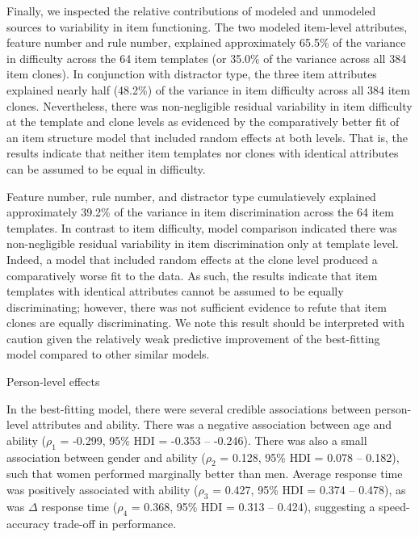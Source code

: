 \documentclass[a4paper,man,natbib]{apa6}
\makeatletter
\renewcommand{\subsubsection}{\@startsection{subsubsection}{3}
  {\z@}%
  {\b@level@two@skip}{\e@level@two@skip}%
  {\normalfont\normalsize\bfseries}}
\makeatother
\begin{document}
Finally, we inspected the relative contributions of modeled and unmodeled sources to variability in item functioning. The two modeled item-level attributes, feature number and rule number, explained approximately 65.5\% of the variance in difficulty across the 64 item templates (or 35.0\% of the variance across all 384 item clones). In conjunction with distractor type, the three item attributes explained nearly half (48.2\%) of the variance in item difficulty across all 384 item clones. Nevertheless, there was non-negligible residual variability in item difficulty at the template and clone levels as evidenced by the comparatively better fit of an item structure model that included random effects at both levels. That is, the results indicate that neither item templates nor clones with identical attributes can be assumed to be equal in difficulty. 

Feature number, rule number, and distractor type cumulatievely explained approximately 39.2\% of the variance in item discrimination across the 64 item templates. In contrast to item difficulty, model comparison indicated there was non-negligible residual variability in item discrimination only at template level. Indeed, a model that included random effects at the clone level produced a comparatively worse fit to the data. As such, the results indicate that item templates with identical attributes cannot be assumed to be equally discriminating; however, there was not sufficient evidence to refute that item clones are equally discriminating. We note this result should be interpreted with caution given the relatively weak predictive improvement of the best-fitting model compared to other similar models.

\subsubsection{Person-level effects}

In the best-fitting model, there were several credible associations between person-level attributes and ability. There was a negative association between age and ability ($\rho_1$ = -0.299, 95\% HDI = -0.353 -- -0.246). There was also a small association between gender and ability ($\rho_2$ = 0.128, 95\% HDI = 0.078 -- 0.182), such that women performed marginally better than men. Average response time was positively associated with ability ($\rho_3$ = 0.427, 95\% HDI = 0.374 -- 0.478), as was $\Delta$ response time ($\rho_4$ = 0.368, 95\% HDI = 0.313 -- 0.424), suggesting a speed-accuracy trade-off in performance.
\end{document}
